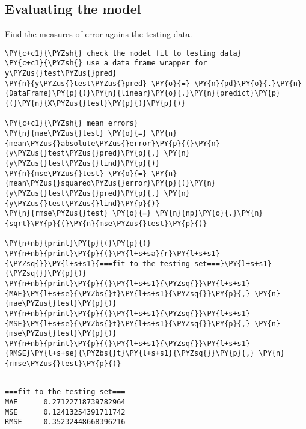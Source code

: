     \hypertarget{evaluating-the-model}{%
\subsection{Evaluating the model}\label{evaluating-the-model}}

    Find the measures of error agains the testing data.

    \begin{tcolorbox}[breakable, size=fbox, boxrule=1pt, pad at break*=1mm,colback=cellbackground, colframe=cellborder]
\begin{Verbatim}[commandchars=\\\{\}]
\PY{c+c1}{\PYZsh{} check the model fit to testing data}
\PY{c+c1}{\PYZsh{} use a data frame wrapper for y\PYZus{}test\PYZus{}pred}
\PY{n}{y\PYZus{}test\PYZus{}pred} \PY{o}{=} \PY{n}{pd}\PY{o}{.}\PY{n}{DataFrame}\PY{p}{(}\PY{n}{linear}\PY{o}{.}\PY{n}{predict}\PY{p}{(}\PY{n}{X\PYZus{}test}\PY{p}{)}\PY{p}{)}

\PY{c+c1}{\PYZsh{} mean errors}
\PY{n}{mae\PYZus{}test} \PY{o}{=} \PY{n}{mean\PYZus{}absolute\PYZus{}error}\PY{p}{(}\PY{n}{y\PYZus{}test\PYZus{}pred}\PY{p}{,} \PY{n}{y\PYZus{}test\PYZus{}lind}\PY{p}{)}
\PY{n}{mse\PYZus{}test} \PY{o}{=} \PY{n}{mean\PYZus{}squared\PYZus{}error}\PY{p}{(}\PY{n}{y\PYZus{}test\PYZus{}pred}\PY{p}{,} \PY{n}{y\PYZus{}test\PYZus{}lind}\PY{p}{)}
\PY{n}{rmse\PYZus{}test} \PY{o}{=} \PY{n}{np}\PY{o}{.}\PY{n}{sqrt}\PY{p}{(}\PY{n}{mse\PYZus{}test}\PY{p}{)}

\PY{n+nb}{print}\PY{p}{(}\PY{p}{)}
\PY{n+nb}{print}\PY{p}{(}\PY{l+s+sa}{r}\PY{l+s+s1}{\PYZsq{}}\PY{l+s+s1}{===fit to the testing set===}\PY{l+s+s1}{\PYZsq{}}\PY{p}{)}
\PY{n+nb}{print}\PY{p}{(}\PY{l+s+s1}{\PYZsq{}}\PY{l+s+s1}{MAE}\PY{l+s+se}{\PYZbs{}t}\PY{l+s+s1}{\PYZsq{}}\PY{p}{,} \PY{n}{mae\PYZus{}test}\PY{p}{)}
\PY{n+nb}{print}\PY{p}{(}\PY{l+s+s1}{\PYZsq{}}\PY{l+s+s1}{MSE}\PY{l+s+se}{\PYZbs{}t}\PY{l+s+s1}{\PYZsq{}}\PY{p}{,} \PY{n}{mse\PYZus{}test}\PY{p}{)}
\PY{n+nb}{print}\PY{p}{(}\PY{l+s+s1}{\PYZsq{}}\PY{l+s+s1}{RMSE}\PY{l+s+se}{\PYZbs{}t}\PY{l+s+s1}{\PYZsq{}}\PY{p}{,} \PY{n}{rmse\PYZus{}test}\PY{p}{)}
\end{Verbatim}
\end{tcolorbox}

    \begin{Verbatim}[commandchars=\\\{\}]

===fit to the testing set===
MAE      0.27122718739782964
MSE      0.12413254391711742
RMSE     0.35232448668396216
    \end{Verbatim}

